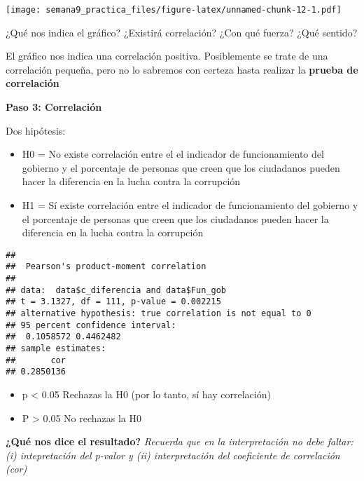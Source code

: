 \documentclass[
]{article}
\newenvironment{Shaded}{\begin{snugshade}}{\end{snugshade}}
\newcommand{\CommentTok}[1]{\textcolor[rgb]{0.56,0.35,0.01}{\textit{#1}}}
\newcommand{\FunctionTok}[1]{\textcolor[rgb]{0.00,0.00,0.00}{#1}}
\newcommand{\NormalTok}[1]{#1}
\newcommand{\SpecialCharTok}[1]{\textcolor[rgb]{0.00,0.00,0.00}{#1}}
\providecommand{\tightlist}{%
  \setlength{\itemsep}{0pt}\setlength{\parskip}{0pt}}
\begin{document}
\texttt{[image: semana9\_practica\_files/figure-latex/unnamed-chunk-12-1.pdf]}

¿Qué nos indica el gráfico? ¿Existirá correlación? ¿Con qué fuerza? ¿Qué
sentido?

El gráfico nos indica una correlación positiva. Posiblemente se trate de
una correlación pequeña, pero no lo sabremos con certeza hasta realizar
la \textbf{prueba de correlación}

\textbf{Paso 3: Correlación}

Dos hipótesis:

\begin{itemize}
\tightlist
\item
  H0 = No existe correlación entre el el indicador de funcionamiento del
  gobierno y el porcentaje de personas que creen que los ciudadanos
  pueden hacer la diferencia en la lucha contra la corrupción
\item
  H1 = Sí existe correlación entre el indicador de funcionamiento del
  gobierno y el porcentaje de personas que creen que los ciudadanos
  pueden hacer la diferencia en la lucha contra la corrupción
\end{itemize}

\begin{Shaded}
\end{Shaded}

\begin{verbatim}
## 
##  Pearson's product-moment correlation
## 
## data:  data$c_diferencia and data$Fun_gob
## t = 3.1327, df = 111, p-value = 0.002215
## alternative hypothesis: true correlation is not equal to 0
## 95 percent confidence interval:
##  0.1058572 0.4462482
## sample estimates:
##       cor 
## 0.2850136
\end{verbatim}

\begin{itemize}
\tightlist
\item
  p \textless{} 0.05 Rechazas la H0 (por lo tanto, sí hay correlación)
\item
  P \textgreater{} 0.05 No rechazas la H0
\end{itemize}

\textbf{¿Qué nos dice el resultado?} \emph{Recuerda que en la
interpretación no debe faltar: (i) intepretación del p-valor y (ii)
interpretación del coeficiente de correlación (cor)}
\end{document}
